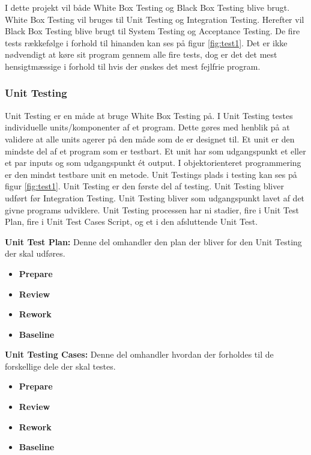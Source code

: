 I dette projekt vil både White Box Testing og Black Box Testing blive brugt. White Box Testing vil bruges til Unit Testing og Integration Testing. Herefter vil Black Box Testing blive brugt til System Testing og Acceptance Testing. De fire tests rækkefølge i forhold til hinanden kan ses på figur \ref{fig:test1}. Det er ikke nødvendigt at køre sit program gennem alle fire tests, dog er det det mest hensigtmæssige i forhold til hvis der ønskes det mest fejlfrie program.

\subsubsection{Unit Testing} \label{test}

Unit Testing er en måde at bruge White Box Testing på. I Unit Testing testes individuelle units/komponenter af et program. Dette gøres med henblik på at validere at alle units agerer på den måde som de er designet til. Et unit er den mindste del af et program som er testbart. Et unit har som udgangspunkt et eller et par inputs og som udgangspunkt ét output. I objektorienteret programmering er den mindst testbare unit en metode. Unit Testings plads i testing kan ses på figur \ref{fig:test1}. Unit Testing er den første del af testing. Unit Testing bliver udført før Integration Testing. Unit Testing bliver som udgangspunkt lavet af det givne programs udviklere. Unit Testing processen har ni stadier, fire i Unit Test Plan, fire i Unit Test Cases Script, og et i den afsluttende Unit Test.

\textbf{Unit Test Plan:} Denne del omhandler den plan der bliver for den Unit Testing der skal udføres.

\begin{itemize}
\item{\textbf{Prepare}}
\item{\textbf{Review}}
\item{\textbf{Rework}}
\item{\textbf{Baseline}}
\end{itemize}

\textbf{Unit Testing Cases:} Denne del omhandler hvordan der forholdes til de forskellige dele der skal testes.

\begin{itemize}
\item{\textbf{Prepare}}
\item{\textbf{Review}}
\item{\textbf{Rework}}
\item{\textbf{Baseline}}
\end{itemize}

